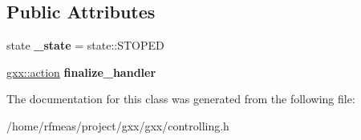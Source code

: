 \subsection*{Public Attributes}
\begin{DoxyCompactItemize}
\item 
state {\bfseries \+\_\+state} = state\+::\+S\+T\+O\+P\+ED\hypertarget{classgxx_1_1controller_a42a5dab49c033e9998e8acd90d801bf4}{}\label{classgxx_1_1controller_a42a5dab49c033e9998e8acd90d801bf4}

\item 
\hyperlink{classgxx_1_1delegate}{gxx\+::action} {\bfseries finalize\+\_\+handler}\hypertarget{classgxx_1_1controller_a365dc6aee9ece7677c40ed77d2053da1}{}\label{classgxx_1_1controller_a365dc6aee9ece7677c40ed77d2053da1}

\end{DoxyCompactItemize}


The documentation for this class was generated from the following file\+:\begin{DoxyCompactItemize}
\item 
/home/rfmeas/project/gxx/gxx/controlling.\+h\end{DoxyCompactItemize}
